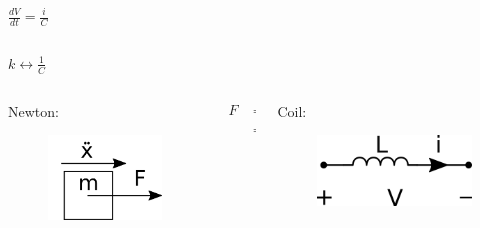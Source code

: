 \begin{frame}
\begin{columns}
		\begin{column}{0.25\linewidth}
			\hspace{3pt}
			$\frac{dV}{dt} = \frac{i}{C}$
		\end{column}
		
	\end{columns}
	
	\begin{center}
		$\boxed{k \leftrightarrow \frac{1}{C}} $	
	\end{center}
	
	\pause
	
	\begin{columns}
		\begin{column}{0.25\linewidth}
			Newton:
			\begin{figure}
				\includegraphics[width=1\linewidth]{img/newton}
			\end{figure}
		\end{column}
		
		\begin{column}{0.25\linewidth}
			\hspace{3pt}
			\begin{align*}
				F &= m \ddot{x} \\ 
				  &= m \frac{d\dot{x}}{dt}
			\end{align*} 
		\end{column}
		
		\begin{column}{0.25\linewidth}
			Coil:
			\begin{figure}
				\includegraphics[width=1\linewidth]{img/coil}
				\label{fig:coil}
			\end{figure}
		\end{column}
		

\end{columns}
\end{frame}
